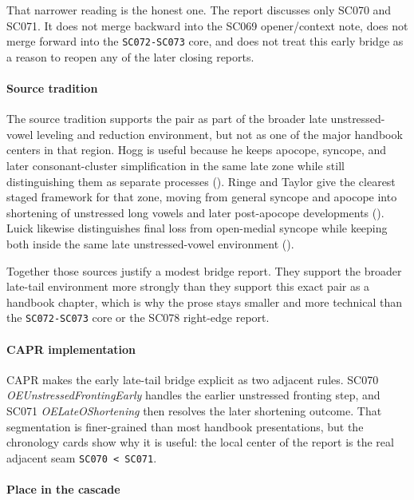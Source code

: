 \documentclass[
  british,
  a4paper,
]{article}
\begin{document}
That narrower reading is the honest one. The report discusses only SC070
and SC071. It does not merge backward into the SC069 opener/context
note, does not merge forward into the \texttt{SC072-SC073} core, and
does not treat this early bridge as a reason to reopen any of the later
closing reports.

\paragraph{Source tradition}\label{source-tradition-44}

The source tradition supports the pair as part of the broader late
unstressed-vowel leveling and reduction environment, but not as one of
the major handbook centers in that region. Hogg is useful because he
keeps apocope, syncope, and later consonant-cluster simplification in
the same late zone while still distinguishing them as separate processes
(). Ringe and Taylor give the
clearest staged framework for that zone, moving from general syncope and
apocope into shortening of unstressed long vowels and later post-apocope
developments (). Luick likewise distinguishes final
loss from open-medial syncope while keeping both inside the same late
unstressed-vowel environment ().

Together those sources justify a modest bridge report. They support the
broader late-tail environment more strongly than they support this exact
pair as a handbook chapter, which is why the prose stays smaller and
more technical than the \texttt{SC072-SC073} core or the SC078
right-edge report.

\paragraph{CAPR implementation}\label{capr-implementation-44}

CAPR makes the early late-tail bridge explicit as two adjacent rules.
SC070 \emph{OEUnstressedFrontingEarly} handles the earlier unstressed
fronting step, and SC071 \emph{OELateOShortening} then resolves the
later shortening outcome. That segmentation is finer-grained than most
handbook presentations, but the chronology cards show why it is useful:
the local center of the report is the real adjacent seam
\texttt{SC070\ \textless{}\ SC071}.

\paragraph{Place in the cascade}\label{place-in-the-cascade-44}
\end{document}
